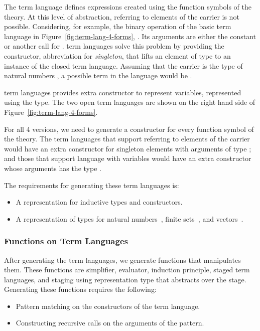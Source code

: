 The  term language defines expressions created using the function symbols of the theory. At this level of abstraction, referring to elements of the carrier is not possible.
Considering, for example, the binary operation of the basic  term language in Figure~\ref{fig:term-lang-4-forms}, . Its arguments are either the constant  or another call for . 
 term languages solve this problem by providing the  constructor, abbreviation for \emph{singleton}, that lifts an element of type  to an instance of the closed term language. Assuming that the carrier is the type of natural numbers , a possible term in the language would be . 

 term languages provides extra constructor to represent variables, represented using the  type. The two open term languages are shown on the right hand side of Figure~\ref{fig:term-lang-4-forms}.  

For all 4 versions, we need to generate a constructor for every function symbol of the theory. The term languages that support referring to elements of the carrier would have an extra constructor for singleton elements with arguments of type ; and those that support language with variables would have an extra constructor whose arguments has the type . 

The requirements for generating these term languages is: 
\begin{itemize}
\item A representation for inductive types and constructors.  
\item A representation of types for natural numbers~, finite sets~, and vectors~. 
\end{itemize}

\subsubsection{Functions on Term Languages}
\label{sec:gen:reqs:funcs}
After generating the term languages, we generate functions that manipulates them. These functions are simplifier, evaluator, induction principle, staged term languages, and staging using representation type that abstracts over the stage. Generating these functions requires the following: 
\begin{itemize}
\item Pattern matching on the constructors of the term language.  
\item Constructing recursive calls on the arguments of the pattern. 
\end{itemize} 

